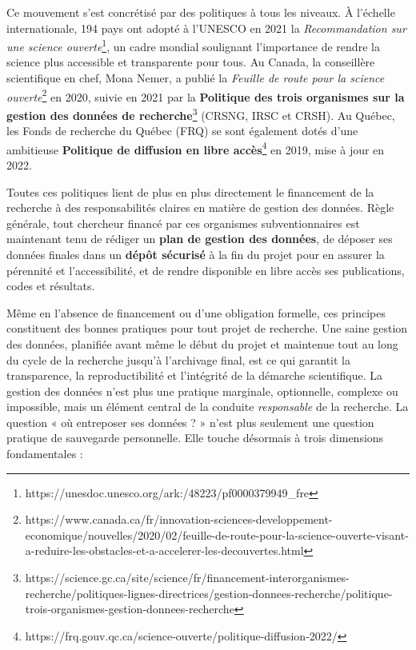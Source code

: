 \documentclass[
  letterpaper,
  DIV=11,
  numbers=noendperiod,
  oneside]{scrreprt}
\begin{document}
Ce mouvement s'est concrétisé par des politiques à tous les niveaux. À
l'échelle internationale, 194 pays ont adopté à l'UNESCO en 2021 la
\emph{Recommandation sur une science ouverte}\footnote{https://unesdoc.unesco.org/ark:/48223/pf0000379949\_fre},
un cadre mondial soulignant l'importance de rendre la science plus
accessible et transparente pour tous. Au Canada, la conseillère
scientifique en chef, Mona Nemer, a publié la \emph{Feuille de route
pour la science ouverte}\footnote{https://www.canada.ca/fr/innovation-sciences-developpement-economique/nouvelles/2020/02/feuille-de-route-pour-la-science-ouverte-visant-a-reduire-les-obstacles-et-a-accelerer-les-decouvertes.html}
en 2020, suivie en 2021 par la \textbf{Politique des trois organismes
sur la gestion des données de recherche}\footnote{https://science.gc.ca/site/science/fr/financement-interorganismes-recherche/politiques-lignes-directrices/gestion-donnees-recherche/politique-trois-organismes-gestion-donnees-recherche}
(CRSNG, IRSC et CRSH). Au Québec, les Fonds de recherche du Québec (FRQ)
se sont également dotés d'une ambitieuse \textbf{Politique de diffusion
en libre accès}\footnote{https://frq.gouv.qc.ca/science-ouverte/politique-diffusion-2022/}
en 2019, mise à jour en 2022.

Toutes ces politiques lient de plus en plus directement le financement
de la recherche à des responsabilités claires en matière de gestion des
données. Règle générale, tout chercheur financé par ces organismes
subventionnaires est maintenant tenu de rédiger un \textbf{plan de
gestion des données}, de déposer ses données finales dans un
\textbf{dépôt sécurisé} à la fin du projet pour en assurer la pérennité
et l'accessibilité, et de rendre disponible en libre accès ses
publications, codes et résultats.

Même en l'absence de financement ou d'une obligation formelle, ces
principes constituent des bonnes pratiques pour tout projet de
recherche. Une saine gestion des données, planifiée avant même le début
du projet et maintenue tout au long du cycle de la recherche jusqu'à
l'archivage final, est ce qui garantit la transparence, la
reproductibilité et l'intégrité de la démarche scientifique. La gestion
des données n'est plus une pratique marginale, optionnelle, complexe ou
impossible, mais un élément central de la conduite \emph{responsable} de
la recherche. La question « où entreposer ses données ? » n'est plus
seulement une question pratique de sauvegarde personnelle. Elle touche
désormais à trois dimensions fondamentales :
\end{document}
